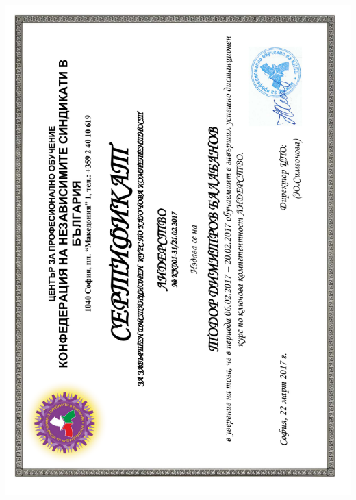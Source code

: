 \documentclass[english,a4paper]{europasscv}
\begin{document}
\includegraphics[width=\textwidth,height=\textheight,keepaspectratio]{KNSB2017_2}
\end{document}
